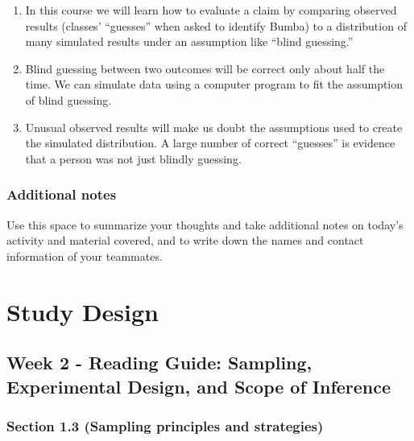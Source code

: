\documentclass[
]{report}
\begin{document}
\begin{enumerate}
\def\labelenumi{\arabic{enumi}.}
\item
  In this course we will learn how to evaluate a claim by comparing observed results (classes' ``guesses'' when asked to identify Bumba) to a distribution of many simulated results under an assumption like ``blind guessing.''
\item
  Blind guessing between two outcomes will be correct only about half the time. We can simulate data using a computer program to fit the assumption of blind guessing.
\item
  Unusual observed results will make us doubt the assumptions used to create the simulated distribution. A large number of correct ``guesses'' is evidence that a person was not just blindly guessing.
\end{enumerate}

\hypertarget{additional-notes}{%
\subsection{Additional notes}\label{additional-notes}}

Use this space to summarize your thoughts and take additional notes on today's activity and material covered, and to write down the names and contact information of your teammates.

\hypertarget{study-design}{%
\chapter{Study Design}\label{study-design}}

\hypertarget{week-2---reading-guide-sampling-experimental-design-and-scope-of-inference}{%
\section{Week 2 - Reading Guide: Sampling, Experimental Design, and Scope of Inference}\label{week-2---reading-guide-sampling-experimental-design-and-scope-of-inference}}

\hypertarget{section-1.3-sampling-principles-and-strategies}{%
\subsection*{Section 1.3 (Sampling principles and strategies)}\label{section-1.3-sampling-principles-and-strategies}}
\end{document}
